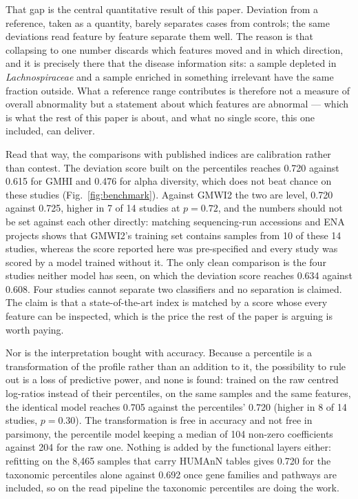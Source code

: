 \documentclass[conference]{IEEEtran}
\begin{document}
That gap is the central quantitative result of this paper. Deviation from a reference, taken as a quantity, barely separates cases from controls; the same deviations read feature by feature separate them well. The reason is that collapsing to one number discards which features moved and in which direction, and it is precisely there that the disease information sits: a sample depleted in \textit{Lachnospiraceae} and a sample enriched in something irrelevant have the same fraction outside. What a reference range contributes is therefore not a measure of overall abnormality but a statement about which features are abnormal --- which is what the rest of this paper is about, and what no single score, this one included, can deliver.

Read that way, the comparisons with published indices are calibration rather than contest. The deviation score built on the percentiles reaches 0.720 against 0.615 for GMHI and 0.476 for alpha diversity, which does not beat chance on these studies (Fig.~\ref{fig:benchmark}). Against GMWI2 the two are level, 0.720 against 0.725, higher in 7 of 14 studies at $p = 0.72$, and the numbers should not be set against each other directly: matching sequencing-run accessions and ENA projects shows that GMWI2's training set contains samples from 10 of these 14 studies, whereas the score reported here was pre-specified and every study was scored by a model trained without it. The only clean comparison is the four studies neither model has seen, on which the deviation score reaches 0.634 against 0.608. Four studies cannot separate two classifiers and no separation is claimed. The claim is that a state-of-the-art index is matched by a score whose every feature can be inspected, which is the price the rest of the paper is arguing is worth paying.

Nor is the interpretation bought with accuracy. Because a percentile is a transformation of the profile rather than an addition to it, the possibility to rule out is a loss of predictive power, and none is found: trained on the raw centred log-ratios instead of their percentiles, on the same samples and the same features, the identical model reaches 0.705 against the percentiles' 0.720 (higher in 8 of 14 studies, $p = 0.30$). The transformation is free in accuracy and not free in parsimony, the percentile model keeping a median of 104 non-zero coefficients against 204 for the raw one. Nothing is added by the functional layers either: refitting on the 8{,}465 samples that carry HUMAnN tables gives 0.720 for the taxonomic percentiles alone against 0.692 once gene families and pathways are included, so on the read pipeline the taxonomic percentiles are doing the work.
\end{document}
